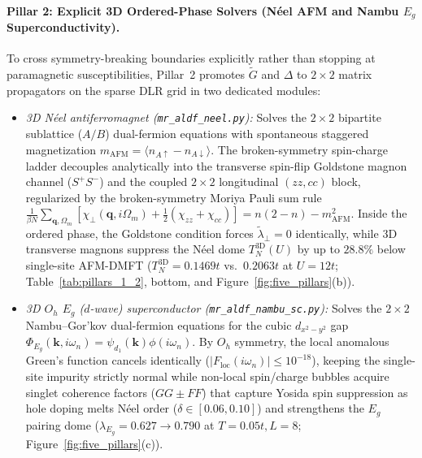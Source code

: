 \documentclass[11pt,a4paper]{article}
\numberwithin{equation}{section}
\theoremstyle{plain}
\theoremstyle{definition}
\providecommand{\vk}{\mathbf{k}}
\providecommand{\vq}{\mathbf{q}}
\begin{document}
\paragraph{Pillar 2: Explicit 3D Ordered-Phase Solvers (N\'eel AFM and Nambu $E_g$ Superconductivity).}
To cross symmetry-breaking boundaries explicitly rather than stopping at paramagnetic susceptibilities, Pillar~2 promotes $\tilde{G}$ and $\Delta$ to $2\times 2$ matrix propagators on the sparse DLR grid in two dedicated modules:
\begin{itemize}
  \item \emph{3D N\'eel antiferromagnet (\texttt{mr\_aldf\_neel.py}):} Solves the $2\times 2$ bipartite sublattice ($A/B$) dual-fermion equations with spontaneous staggered magnetization $m_{\mathrm{AFM}} = \langle n_{A\uparrow} - n_{A\downarrow}\rangle$. The broken-symmetry spin-charge ladder decouples analytically into the transverse spin-flip Goldstone magnon channel ($S^+S^-$) and the coupled $2\times 2$ longitudinal $(zz,cc)$ block, regularized by the broken-symmetry Moriya Pauli sum rule $\frac{1}{\beta N}\sum_{\vq,\Omega_m}[\chi_\perp(\vq,i\Omega_m) + \frac{1}{2}(\chi_{zz} + \chi_{cc})] = n(2-n) - m_{\mathrm{AFM}}^2$. Inside the ordered phase, the Goldstone condition forces $\tilde{\lambda}_\perp = 0$ identically, while 3D transverse magnons suppress the N\'eel dome $T_N^{\mathrm{3D}}(U)$ by up to $28.8\%$ below single-site AFM-DMFT ($T_N^{\mathrm{3D}} = 0.1469t$ vs.\ $0.2063t$ at $U = 12t$; Table~\ref{tab:pillars_1_2}, bottom, and Figure~\ref{fig:five_pillars}(b)).
  \item \emph{3D $O_h$ $E_g$ ($d$-wave) superconductor (\texttt{mr\_aldf\_nambu\_sc.py}):} Solves the $2\times 2$ Nambu--Gor'kov dual-fermion equations for the cubic $d_{x^2-y^2}$ gap $\Phi_{E_g}(\vk,i\omega_n) = \psi_{d_1}(\vk)\phi(i\omega_n)$. By $O_h$ symmetry, the local anomalous Green's function cancels identically ($|F_{\mathrm{loc}}(i\omega_n)| \le 10^{-18}$), keeping the single-site impurity strictly normal while non-local spin/charge bubbles acquire singlet coherence factors ($G G \pm F F$) that capture Yosida spin suppression as hole doping melts N\'eel order ($\delta \in [0.06, 0.10]$) and strengthens the $E_g$ pairing dome ($\lambda_{E_g} = 0.627 \to 0.790$ at $T = 0.05t, L = 8$; Figure~\ref{fig:five_pillars}(c)).
\end{itemize}
\end{document}
